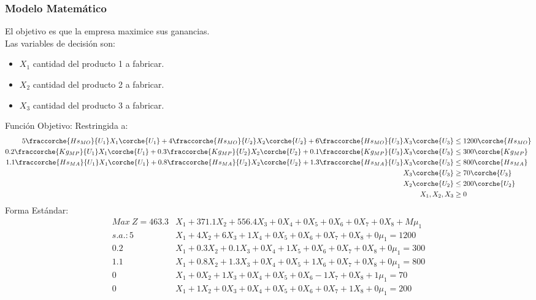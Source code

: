 

\begin{homeworkProblem}[-1][Empresita]
\subsubsection{Modelo Matemático}
El objetivo es que la empresa maximice sus ganancias.\\
Las variables de decisión son:
\begin{itemize}
    \item $X_1$ cantidad del producto 1 a fabricar.
    \item $X_2$ cantidad del producto 2 a fabricar.
    \item $X_3$ cantidad del producto 3 a fabricar.
\end{itemize}
Función Objetivo:
Restringida a:
\begin{align*}
    5\fraccorche{Hs_{MO}}{U_1}X_1\corche{U_1} + 4\fraccorche{Hs_{MO}}{U_2}X_2\corche{U_2} + 6\fraccorche{Hs_{MO}}{U_3}X_3\corche{U_3} &\le 1200\corche{Hs_{MO}} \\
    0.2\fraccorche{Kg_{MP}}{U_1}X_1\corche{U_1} + 0.3\fraccorche{Kg_{MP}}{U_2}X_2\corche{U_2} + 0.1\fraccorche{Kg_{MP}}{U_3}X_3\corche{U_3} &\le 300\corche{Kg_{MP}} \\
    1.1\fraccorche{Hs_{MA}}{U_1}X_1\corche{U_1} + 0.8\fraccorche{Hs_{MA}}{U_2}X_2\corche{U_2} + 1.3\fraccorche{Hs_{MA}}{U_3}X_3\corche{U_3} &\le 800\corche{Hs_{MA}} \\
    X_3\corche{U_3} &\ge 70\corche{U_3} \\
    X_2\corche{U_2} &\le 200\corche{U_2} \\
    X_1,X_2,X_3 &\ge 0
\end{align*}
Forma Estándar: 
\begin{align*}
    Max\ Z = 463.3&X_1 + 371.1X_2 + 556.4X_3 + 0X_4 + 0X_5 + 0X_6 + 0X_7 + 0X_8 + M\mu_1 \\
    s.a.: 5&X_1 + 4X_2 + 6X_3 + 1X_4 + 0X_5 + 0X_6 + 0X_7 + 0X_8 + 0\mu_1 = 1200 \\
    0.2&X_1 + 0.3X_2 + 0.1X_3 + 0X_4 + 1X_5 + 0X_6 + 0X_7 + 0X_8 + 0\mu_1 = 300 \\
    1.1&X_1 + 0.8X_2 + 1.3X_3 + 0X_4 + 0X_5 + 1X_6 + 0X_7 + 0X_8 + 0\mu_1 = 800 \\
    0&X_1 + 0X_2 + 1X_3 + 0X_4 + 0X_5 + 0X_6 - 1X_7 + 0X_8 + 1\mu_1 = 70 \\
    0&X_1 + 1X_2 + 0X_3 + 0X_4 + 0X_5 + 0X_6 + 0X_7 + 1X_8 + 0\mu_1 = 200 \\
\end{align*}

\end{homeworkProblem}
